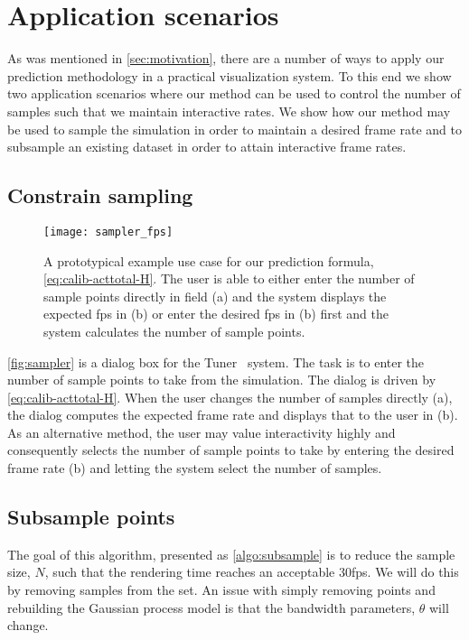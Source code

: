 \section{Application scenarios}
\label{sec:application_scenarios}

As was mentioned in \autoref{sec:motivation}, there are a number of ways to apply
our prediction methodology in a practical visualization system. 
To this end we show two application scenarios where our method can be
used to control the number of samples such that we maintain interactive 
rates.  We show how our method may be used 
to sample the simulation in order
to maintain a desired frame rate and to subsample an existing dataset in
order to attain interactive frame rates.

\subsection{Constrain sampling}
\label{sec:constrainsampling}

\begin{figure}[h]
\centering
\texttt{[image: sampler\_fps]}
\caption[Using rendering time prediction to constrain sampling]{%
  A prototypical example use case for our prediction formula,
  \autoref{eq:calib-acttotal-H}. The user
  is able to either enter the number of sample points directly in field (a)
  and the system displays the expected fps in (b) or enter the desired fps
  in (b) first and the system calculates the number of sample points.
}
\label{fig:sampler}
\end{figure}


\autoref{fig:sampler} is a dialog box for the Tuner~\cite{Torsney-Weir:2011} system. 
The task is
to enter the number of sample points to take from the simulation. The dialog
is driven by \autoref{eq:calib-acttotal-H}. When the user changes the number of
samples directly (a), the dialog computes the expected frame rate and displays
that to the user in (b). As an alternative method, the user may value
interactivity highly and consequently selects the number of sample points to
take by entering the desired frame rate (b) and letting the system select the
number of samples.

\subsection{Subsample points}
\label{sec:subsamplepoints}

The goal of this algorithm, presented as \autoref{algo:subsample} is to reduce the
sample size, $N$, such that the rendering time reaches an acceptable 30fps.
We will do this by removing samples from the set.  An issue with simply
removing points and rebuilding the Gaussian process model is that the
bandwidth parameters, $\theta$ will change.

